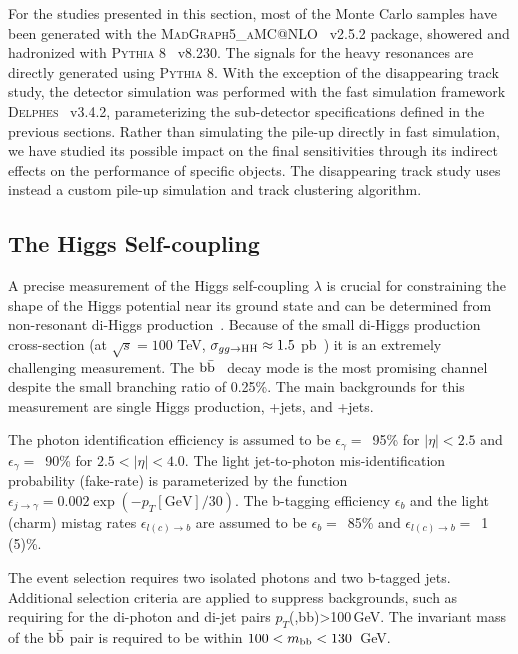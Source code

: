 \documentclass[11pt,twoside,a4paper]{cernrep}
\newcommand*{\effg}{\ensuremath{\epsilon_{\gamma}}}
\newcommand*{\misg}{\ensuremath{\epsilon_{j \rightarrow \gamma}}}
\newcommand*{\effb}{\ensuremath{\epsilon_{b}}}
\newcommand*{\mislc}{\ensuremath{\epsilon_{l(c) \rightarrow b}}}
\begin{document}
For the studies presented in this section, most of the Monte Carlo samples have been generated with the \textsc{MadGraph5\_aMC@NLO}~\cite{Alwall:2014hca} v2.5.2 package, showered and hadronized with \textsc{Pythia 8}~\cite{Sjostrand:2007gs} v8.230. The signals for the heavy resonances are directly generated using \textsc{Pythia 8}.
With the exception of the disappearing track study, the detector simulation was performed with the fast simulation framework \textsc{Delphes}~\cite{deFavereau:2013fsa} v3.4.2, parameterizing  the sub-detector specifications defined in the previous sections. Rather than simulating the pile-up directly in fast simulation, we have studied its possible impact on the final sensitivities through its indirect effects on the performance of specific objects. The disappearing track study uses instead a custom pile-up simulation and track clustering algorithm.

\subsection{The Higgs Self-coupling}
A precise measurement of the Higgs self-coupling $\lambda$ is crucial for constraining the shape of the Higgs potential near its ground state and can be determined from non-resonant di-Higgs production~\cite{Baglio:2012np}. Because of the small di-Higgs production cross-section (at $\sqrt{s} {=}100$ TeV, $\sigma_{gg\to {\rm HH}} \approx 1.5$ pb~\cite{Contino:2016spe}) it is an extremely challenging measurement. The $\rm b\bar{b}$\textgamma\textgamma~ decay mode is the most promising channel despite the small branching ratio of 0.25\%. The main backgrounds for this measurement are single Higgs production, \textgamma\textgamma+jets, and \textgamma+jets.

The photon identification efficiency is assumed to be $\effg=$~95\% for $|\eta| < 2.5$ and $\effg=$~90\% for $2.5 < |\eta| < 4.0$. The light jet-to-photon mis-identification probability (fake-rate) is parameterized by the function $\misg = 0.002 \exp(-p_T[\mathrm{GeV}]/30)$. The b-tagging efficiency $\effb$ and the light (charm) mistag rates $\mislc$ are assumed to be $\effb=$~85\% and $\mislc=$~1 (5)\%.

The event selection requires two isolated photons and two b-tagged jets. Additional selection criteria are applied to suppress backgrounds, such as requiring for the di-photon and di-jet pairs $p_T$(\textgamma\textgamma,bb)>100\,GeV. The invariant mass of the $\rm b\bar{b}$ pair is required to be within \linebreak \mbox{$100 <m_{\rm bb} < 130$ GeV}.
\end{document}
